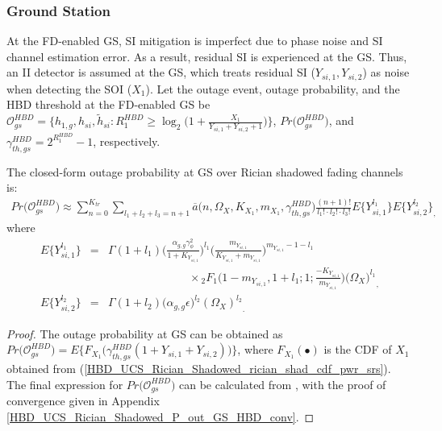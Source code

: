 \subsubsection{Ground Station}
At the FD-enabled GS, SI mitigation is imperfect due to phase noise and SI channel estimation error. As a result, residual SI is experienced at the GS. Thus, an II detector is assumed at the GS, which treats residual SI ($Y_{si,1},Y_{si,2}$) as noise when detecting the SOI ($X_1$). Let the outage event, outage probability, and the HBD threshold at the FD-enabled GS be $\mathcal{O}_{gs}^{HBD} = \Big\{ h_{1,g}, h_{si}, \widetilde{h}_{si}: R_{1}^{HBD} \geq \log_{2}\Big(1 + \frac{X_{1}}{Y_{si,1} + Y_{si,2} + 1}\Big)\Big\}$, $Pr\big(\mathcal{O}_{gs}^{HBD}\big)$, and $\gamma_{th,gs}^{HBD} = 2^{R_{1}^{HBD}}-1$, respectively.

\begin{theorem} \label{HBD_UCS_Rician_Shadowed_P_out_gs_theorem}
The closed-form outage probability at GS over Rician shadowed fading channels is:
\begin{eqnarray} \label{HBD_UCS_Rician_Shadowed_P_out_GS_HBD}
Pr\big(\mathcal{O}_{gs}^{HBD}\big) \approx \sum_{n=0}^{K_{tr}} \sum_{l_1 + l_2 + l_3 = n+1} \overline{a}\big(n,\Omega_X,K_{X_1},m_{X_1},\gamma_{th,gs}^{HBD}\big) \frac{(n+1)!}{l_1! \cdot l_2! \cdot l_3!} E\{Y_{si,1}^{l_1}\} E\{Y_{si,2}^{l_2}\}_,
\end{eqnarray}
where
\begin{eqnarray}
E\{Y_{si,1}^{l_1}\} & = & \Gamma(1+l_1) \bigg(\frac{\alpha_{g,g}\gamma_{\phi}^2}{1+K_{Y_{si,1}}}\bigg)^{l_1} \bigg(\frac{m_{Y_{si,1}}}{K_{Y_{si,1}}+m_{Y_{si,1}}}\bigg)^{m_{Y_{si,1}}-1-l_1} \nonumber\\
 & & \hspace{3cm} \times {}_2F_1\bigg(1-m_{Y_{si,1}},1+l_1;1;\frac{-K_{Y_{si,1}}}{m_{Y_{si,1}}}\bigg) {\big(\Omega_X\big)^{l_1}}_, \\
E\{Y_{si,2}^{l_2}\} & = & \Gamma(1+l_2) (\alpha_{g,g}\epsilon\big)^{l_2} {(\Omega_X)^{l_2}}_.
\end{eqnarray}
\end{theorem}
\begin{proof}
The outage probability at GS can be obtained as $Pr\big(\mathcal{O}_{gs}^{HBD}\big) = E\Big\{F_{X_{1}}\Big( \gamma_{th,gs}^{HBD}(1+Y_{si,1}+Y_{si,2}) \Big)\Big\}$, where $F_{X_{1}}(\bullet)$ is the CDF of $X_1$ obtained from (\ref{HBD_UCS_Rician_Shadowed_rician_shad_cdf_pwr_srs}). The final expression for $Pr\big(\mathcal{O}_{gs}^{HBD}\big)$ can be calculated from \cite[eq. (8)]{rached2017unified}, with the proof of convergence given in Appendix \ref{HBD_UCS_Rician_Shadowed_P_out_GS_HBD_conv}.\end{proof}


